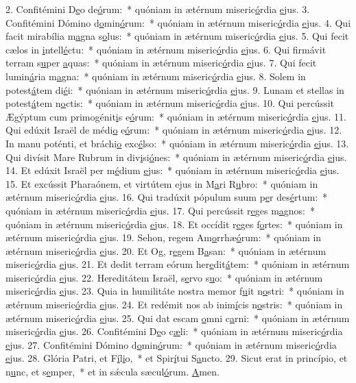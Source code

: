 2. Confitémini D\uline{e}o de\uline{ó}rum:~* quóniam in ætérnum miseric\uline{ó}rdia \uline{e}jus.
3. Confitémini Dómino d\uline{o}min\uline{ó}rum:~* quóniam in ætérnum miseric\uline{ó}rdia \uline{e}jus.
4. Qui facit mirabília m\uline{a}gna s\uline{o}lus:~* quóniam in ætérnum miseric\uline{ó}rdia \uline{e}jus.
5. Qui fecit cælos in \uline{i}ntell\uline{é}ctu:~* quóniam in ætérnum miseric\uline{ó}rdia \uline{e}jus.
6. Qui firmávit terram s\uline{u}per \uline{a}quas:~* quóniam in ætérnum miseric\uline{ó}rdia \uline{e}jus.
7. Qui fecit lumin\uline{á}ria m\uline{a}gna:~* quóniam in ætérnum miseric\uline{ó}rdia \uline{e}jus.
8. Solem in potest\uline{á}tem di\uline{é}i:~* quóniam in ætérnum miseric\uline{ó}rdia \uline{e}jus.
9. Lunam et stellas in potest\uline{á}tem n\uline{o}ctis:~* quóniam in ætérnum miseric\uline{ó}rdia \uline{e}jus.
10. Qui percússit Ægýptum cum primogénit\uline{i}s e\uline{ó}rum:~* quóniam in ætérnum miseric\uline{ó}rdia \uline{e}jus.
11. Qui edúxit Israël de médi\uline{o} e\uline{ó}rum:~* quóniam in ætérnum miseric\uline{ó}rdia \uline{e}jus.
12. In manu poténti, et bráchi\uline{o} exc\uline{é}lso:~* quóniam in ætérnum miseric\uline{ó}rdia \uline{e}jus.
13. Qui divísit Mare Rubrum in div\uline{i}si\uline{ó}nes:~* quóniam in ætérnum miseric\uline{ó}rdia \uline{e}jus.
14. Et edúxit Israël per m\uline{é}dium \uline{e}jus:~* quóniam in ætérnum miseric\uline{ó}rdia \uline{e}jus.
15. Et excússit Pharaónem, et virtútem ejus in M\uline{a}ri R\uline{u}bro:~* quóniam in ætérnum miseric\uline{ó}rdia \uline{e}jus.
16. Qui tradúxit pópulum suum p\uline{e}r des\uline{é}rtum:~* quóniam in ætérnum miseric\uline{ó}rdia \uline{e}jus.
17. Qui percússit r\uline{e}ges m\uline{a}gnos:~* quóniam in ætérnum miseric\uline{ó}rdia \uline{e}jus.
18. Et occídit r\uline{e}ges f\uline{o}rtes:~* quóniam in ætérnum miseric\uline{ó}rdia \uline{e}jus.
19. Sehon, regem Am\uline{o}rrhæ\uline{ó}rum:~* quóniam in ætérnum miseric\uline{ó}rdia \uline{e}jus.
20. Et Og, r\uline{e}gem B\uline{a}san:~* quóniam in ætérnum miseric\uline{ó}rdia \uline{e}jus.
21. Et dedit terram eórum her\uline{e}dit\uline{á}tem:~* quóniam in ætérnum miseric\uline{ó}rdia \uline{e}jus.
22. Hereditátem Israël, s\uline{e}rvo s\uline{u}o:~* quóniam in ætérnum miseric\uline{ó}rdia \uline{e}jus.
23. Quia in humilitáte nostra memor f\uline{u}it n\uline{o}stri:~* quóniam in ætérnum miseric\uline{ó}rdia \uline{e}jus.
24. Et redémit nos ab inim\uline{í}cis n\uline{o}stris:~* quóniam in ætérnum miseric\uline{ó}rdia \uline{e}jus.
25. Qui dat escam \uline{o}mni c\uline{a}rni:~* quóniam in ætérnum miseric\uline{ó}rdia \uline{e}jus.
26. Confitémini D\uline{e}o c\uline{æ}li:~* quóniam in ætérnum miseric\uline{ó}rdia \uline{e}jus.
27. Confitémini Dómino d\uline{o}min\uline{ó}rum:~* quóniam in ætérnum miseric\uline{ó}rdia \uline{e}jus.
28. Glória Patri, et F\uline{í}l\uline{i}o,~* et Spir\uline{í}tui S\uline{a}ncto.
29. Sicut erat in princípio, et n\uline{u}nc, et s\uline{e}mper,~* et in sǽcula sæcul\uline{ó}rum. \uline{A}men.
